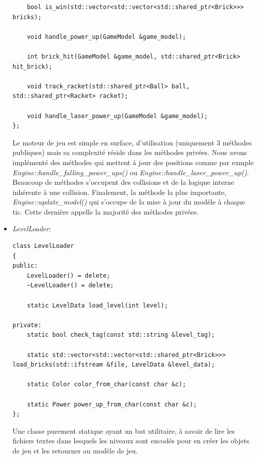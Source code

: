 \documentclass[utf8]{article}
\begin{document}
\begin{itemize}
\begin{verbatim}
    bool is_win(std::vector<std::vector<std::shared_ptr<Brick>>> bricks);

    void handle_power_up(GameModel &game_model);

    int brick_hit(GameModel &game_model, std::shared_ptr<Brick> hit_brick);

    void track_racket(std::shared_ptr<Ball> ball, std::shared_ptr<Racket> racket);

    void handle_laser_power_up(GameModel &game_model);
};
    \end{verbatim}
    Le moteur de jeu est simple en surface, d'utilisation (uniquement 3 méthodes publiques) mais sa complexité réside dans les méthodes privées. Nous avons implémenté des méthodes qui mettent à jour des positions comme par exmple \emph{Engine::handle\_falling\_power\_ups()} ou \emph{Engine::handle\_laser\_power\_up()}. Beaucoup de méthodes s'occupent des collisions et de la logique interne inhérente à une collision. Finalement, la méthode la plus importante, \emph{Engine::update\_model()} qui s'occupe de la mise à jour du modèle à chaque tic. Cette dernière appelle la majorité des méthodes privées. \\

    \item \emph{LevelLoader}:
    \begin{verbatim}
class LevelLoader
{
public:
    LevelLoader() = delete;
    ~LevelLoader() = delete;

    static LevelData load_level(int level);

private:
    static bool check_tag(const std::string &level_tag);

    static std::vector<std::vector<std::shared_ptr<Brick>>> load_bricks(std::ifstream &file, LevelData &level_data);

    static Color color_from_char(const char &c);

    static Power power_up_from_char(const char &c);
};
    \end{verbatim}
    Une classe purement statique ayant un but utilitaire, à savoir de lire les fichiers textes dans lesquels les niveaux sont encodés pour en créer les objets de jeu et les retourner au modèle de jeu. \\
\end{itemize}
\end{document}
